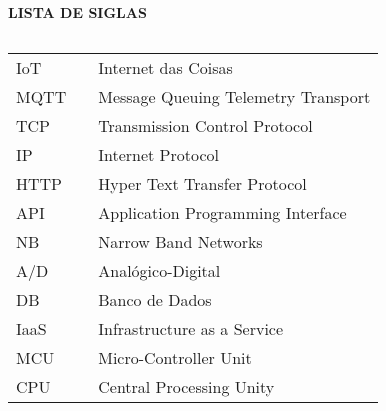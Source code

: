 \newpage

\begin{center}
\textbf{LISTA DE SIGLAS}
\end{center}
$\!$\\

\begin{tabular}{lll}
IoT & \hspace{1cm} & Internet das Coisas \\
MQTT & \hspace{1cm} & Message Queuing Telemetry Transport \\
TCP & \hspace{1cm} & Transmission Control Protocol \\
IP & \hspace{1cm} & Internet Protocol \\
HTTP & \hspace{1cm} & Hyper Text Transfer Protocol \\
API & \hspace{1cm} & Application Programming Interface \\
NB &\hspace{1cm} &  Narrow Band Networks \\
A/D & \hspace{1cm} & Analógico-Digital \\
DB &  \hspace{1cm} & Banco de Dados \\
IaaS & \hspace{1cm} & Infrastructure as a Service \\
MCU & \hspace{1cm} & Micro-Controller Unit \\
CPU & \hspace{1cm} & Central Processing Unity \\


\end{tabular}
